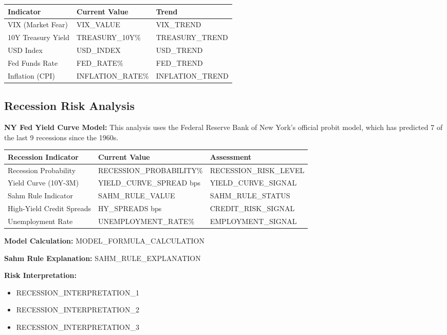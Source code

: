 \documentclass[11pt]{article}
\begin{document}
\begin{center}
\begin{tabularx}{\textwidth}{|X|X|X|}
\hline
\rowcolor{bullish!15}
\textbf{Indicator} & \textbf{Current Value} & \textbf{Trend} \\
\hline
VIX (Market Fear) & {{VIX_VALUE}} & {{VIX_TREND}} \\
10Y Treasury Yield & {{TREASURY_10Y}}\% & {{TREASURY_TREND}} \\
USD Index & {{USD_INDEX}} & {{USD_TREND}} \\
Fed Funds Rate & {{FED_RATE}}\% & {{FED_TREND}} \\
Inflation (CPI) & {{INFLATION_RATE}}\% & {{INFLATION_TREND}} \\
\hline
\end{tabularx}
\end{center}

\subsection{Recession Risk Analysis}

\textbf{NY Fed Yield Curve Model:} This analysis uses the Federal Reserve Bank of New York's official probit model, which has predicted 7 of the last 9 recessions since the 1960s.

\begin{center}
\begin{tabularx}{\textwidth}{|X|X|X|}
\hline
\rowcolor{bearish!15}
\textbf{Recession Indicator} & \textbf{Current Value} & \textbf{Assessment} \\
\hline
Recession Probability & {{RECESSION_PROBABILITY}}\% & {{RECESSION_RISK_LEVEL}} \\
Yield Curve (10Y-3M) & {{YIELD_CURVE_SPREAD}} bps & {{YIELD_CURVE_SIGNAL}} \\
Sahm Rule Indicator & {{SAHM_RULE_VALUE}} & {{SAHM_RULE_STATUS}} \\
High-Yield Credit Spreads & {{HY_SPREADS}} bps & {{CREDIT_RISK_SIGNAL}} \\
Unemployment Rate & {{UNEMPLOYMENT_RATE}}\% & {{EMPLOYMENT_SIGNAL}} \\
\hline
\end{tabularx}
\end{center}

\textbf{Model Calculation:} {{MODEL_FORMULA_CALCULATION}}

\textbf{Sahm Rule Explanation:} {{SAHM_RULE_EXPLANATION}}

\textbf{Risk Interpretation:}
\begin{itemize}
    \item {{RECESSION_INTERPRETATION_1}}
    \item {{RECESSION_INTERPRETATION_2}}
    \item {{RECESSION_INTERPRETATION_3}}
\end{itemize}
\end{document}
